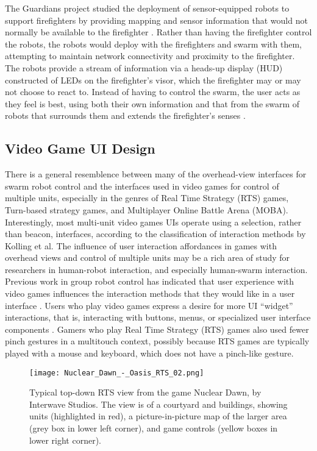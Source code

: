 The Guardians project studied the deployment of sensor-equipped robots to support firefighters by providing mapping and sensor information that would not normally be available to the firefighter \citep{gancet2010user}.
Rather than having the firefighter control the robots, the robots would deploy with the firefighters and swarm with them, attempting to maintain network connectivity and proximity to the firefighter. 
The robots provide a stream of information via a heads-up display (HUD) constructed of LEDs on the firefighter's visor, which the firefighter may or may not choose to react to. 
Instead of having to control the swarm, the user acts as they feel is best, using both their own information and that from the swarm of robots that surrounds them and extends the firefighter's senses \citep{penders2011robot}. 


\subsection{Video Game UI Design} \label{section:Video_Game_UI_Design}

There is a general resemblence between many of the overhead-view interfaces for swarm robot control and the interfaces used in video games for control of multiple units, especially in the genres of Real Time Strategy (RTS) games, Turn-based strategy games, and Multiplayer Online Battle Arena (MOBA). 
Interestingly, most multi-unit video games UIs operate using a selection, rather than beacon, interfaces, according to the classification of interaction methods by Kolling et al. 
The influence of user interaction affordances in games with overhead views and control of multiple units may be a rich area of study for researchers in human-robot interaction, and especially human-swarm interaction. 
Previous work in group robot control has indicated that user experience with video games influences the interaction methods that they would like in a user interface \cite{micire2010multi}.
Users who play video games express a desire for more UI ``widget'' interactions, that is, interacting with buttons, menus, or specialized user interface components \cite{Micire:2009:ANG:1731903.1731912}. 
Gamers who play Real Time Strategy (RTS) games also used fewer pinch gestures in a multitouch context, possibly because RTS games are typically played with a mouse and keyboard, which does not have a pinch-like gesture. 

\begin{figure}
	\centering
	\texttt{[image: Nuclear\_Dawn\_-\_Oasis\_RTS\_02.png]}
	\caption{Typical top-down RTS view from the game Nuclear Dawn, by Interwave Studios. The view is of a courtyard and buildings, showing units (highlighted in red), a picture-in-picture map of the larger area (grey box in lower left corner), and game controls (yellow boxes in lower right corner)\citep{nucleardawn}.}
	\label{fig:Nuclear_dawn_rts}
\end{figure}

